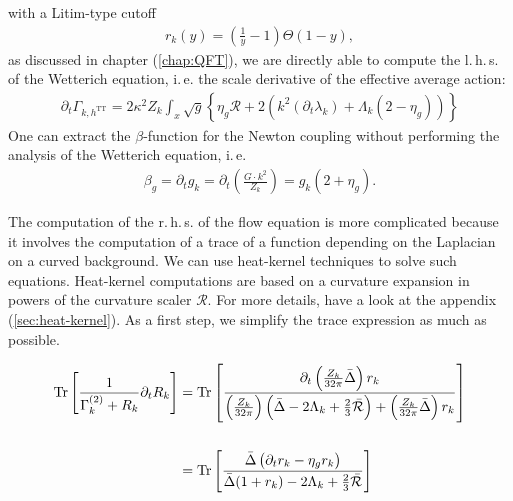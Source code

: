 with a Litim-type cutoff
\begin{align}
r_k(y) = \left(\frac{1}{y}-1\right)\Theta(1-y), \label{eqn:Litim}
\end{align}
as discussed in chapter (\ref{chap:QFT}), we are directly able to compute the l.\,h.\,s. of the Wetterich equation, i.\,e. the scale derivative of the effective average action:
\begin{align}
	\partial_{t}\Gamma_{k,h^{\text{TT}}} = 2\kappa^2 Z_k\int_x \sqrt{g} \left\{\eta_g\mathcal{R}+2\left(k^2(\partial_t\lambda_k) + \Lambda_k(2 - \eta_g)\right)\right\}
\end{align}
One can extract the $\beta$-function for the Newton coupling without performing the analysis of the Wetterich equation, i.\,e. 
\begin{align}
\beta_g = \partial_t g_k = \partial_t\left(\frac{G\cdot k^2}{Z_k}\right) = g_k\left(2+\eta_g\right).
\end{align}

The computation of the r.\,h.\,s. of the flow equation is more complicated because it involves the computation of a trace of a function depending on the Laplacian on a curved background. We can use heat-kernel techniques to solve such equations. Heat-kernel computations are based on a curvature expansion in powers of the curvature scaler $\mathcal{R}$. For more details, have a look at the appendix (\ref{sec:heat-kernel}). As a first step, we simplify the trace expression as much as possible.

\begin{align}
\operatorname{Tr}\left[\frac{1}{\Gamma_{k}^{(2)} + R_k}\partial_t R_k\right] & = \operatorname{Tr}\left[\frac{\partial_t\left(\frac{Z_k}{32\pi}\bar{\Delta}\right)r_k}{\left(\frac{Z_k}{32\pi}\right)\left(\bar{\Delta} - 2\Lambda_k + \frac{2}{3}\bar{\mathcal{R}}\right) + \left(\frac{Z_k}{32\pi}\bar{\Delta}\right) r_k}\right]	\nonumber \\
\phantom{.} \\
&= \operatorname{Tr}\left[\frac{\bar{\Delta}\left(\partial_t r_k - \eta_g r_k\right)}{\bar{\Delta}(1+r_k)-2\Lambda_k+\frac{2}{3}\bar{\mathcal{R}}}\right] \nonumber
\end{align}

